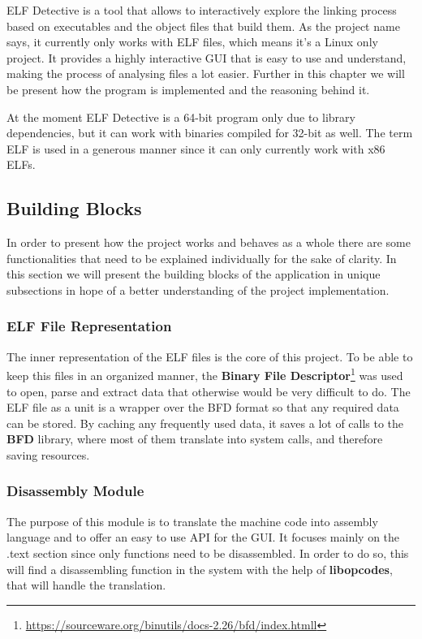 ELF Detective is a tool that allows to interactively explore the linking process based on executables and the object files that build them. As the project name says, it currently only works with ELF files, which means it's a Linux only project. It provides a highly interactive GUI that is easy to use and understand, making the process of analysing files a lot easier. Further in this chapter we will be present how the program is implemented and the reasoning behind it.

At the moment ELF Detective is a 64-{}bit program only due to library dependencies, but it can work with binaries compiled for 32-{}bit as well. The term ELF is used in a generous manner since it can only currently work with x86 ELFs.

\subsection{Building Blocks}
\label{sec:build-blocks}

In order to present how the project works and behaves as a whole there are some functionalities that need to be explained individually for the sake of clarity. In this section we will present the building blocks of the application in unique subsections in hope of a better understanding of the project implementation.

\subsubsection{ELF File Representation}
\label{sub-sec:elf-rep}

The inner representation of the ELF files is the core of this project. To be able to keep this files in an organized manner, the \textbf{Binary File Descriptor}\footnote{\url{https://sourceware.org/binutils/docs-2.26/bfd/index.htmll}} was used to open, parse and extract data that otherwise would be very difficult to do. The ELF file as a unit is a wrapper over the BFD format so that any required data can be stored. By caching any frequently used data, it saves a lot of calls to the \textbf{BFD} library, where most of them translate into system calls, and therefore saving resources. 

\subsubsection{Disassembly Module}
\label{sub-sec:dis-mod}

The purpose of this module is to translate the machine code into assembly language and to offer an easy to use API for the GUI. It focuses mainly on the .text section since only functions need to be disassembled. In order to do so, this will find a disassembling function in the system with the help of \textbf{libopcodes}, that will handle the translation.

